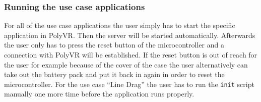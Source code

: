 \subsubsection{Running the use case applications}
For all of the use case applications the user simply has to start the specific application in PolyVR. Then the server will be started automatically. Afterwards the user only has to press the reset button of the microcontroller and a connection with PolyVR will be established. If the reset button is out of reach for the user for example because of the cover of the case the user alternatively can take out the battery pack and put it back in again in order to reset the microcontroller.
For the use case ``Line Drag'' the user has to run the \texttt{init} script manually one more time before the application runs properly. 











